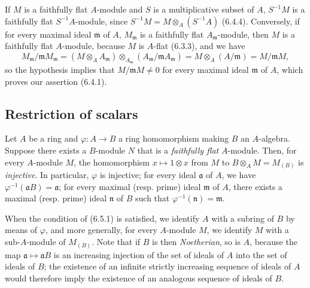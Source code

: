 \begin{env}[6.4.5]
\label{0.6.4.5}
If $M$ is a faithfully flat $A$-module and $S$ is a multiplicative
subset of $A$, $S^{-1}M$ is a faithfully flat $S^{-1}A$-module,
since $S^{-1}M=M\otimes_A(S^{-1}A)$ (6.4.4). Conversely, if for every
maximal ideal $\mathfrak{m}$ of $A$, $M_\mathfrak{m}$ is a faithfully flat
$A_\mathfrak{m}$-module, then $M$ is a faithfully flat $A$-module,
because $M$ is $A$-flat (6.3.3), and we have
\[
  M_\mathfrak{m}/\mathfrak{m}M_\mathfrak{m}
  =(M\otimes_A A_\mathfrak{m})
  \otimes_{A_\mathfrak{m}}
  (A_\mathfrak{m}/\mathfrak{m}A_\mathfrak{m})
  =M\otimes_A(A/\mathfrak{m})
  =M/\mathfrak{m}M,
\]
so the hypothesis implies that $M/\mathfrak{m}M\neq0$ for every maximal
ideal $\mathfrak{m}$ of $A$, which proves our assertion (6.4.1).
\end{env}

\subsection{Restriction of scalars}
\label{subsection:0.6.5}

\begin{env}[6.5.1]
\label{0.6.5.1}
Let $A$ be a ring and $\varphi:A\to B$ a ring homomorphism making
$B$ an $A$-algebra. Suppose there exists a $B$-module $N$ that is a
\emph{faithfully flat} $A$-module. Then, for every $A$-module $M$,
the homomorphism $x\mapsto 1\otimes x$ from $M$ to
$B\otimes_A M=M_{(B)}$ is \emph{injective}. In particular, $\varphi$ is
injective; for every ideal $\mathfrak{a}$ of $A$, we have
$\varphi^{-1}(\mathfrak{a}B)=\mathfrak{a}$; for every maximal (resp.
prime) ideal $\mathfrak{m}$ of $A$, there exists a maximal (resp. prime) ideal
$\mathfrak{n}$ of $B$ such that $\varphi^{-1}(\mathfrak{n})=\mathfrak{m}$.
\end{env}

\begin{env}[6.5.2]
\label{0.6.5.2}
When the condition of (6.5.1) is satisfied, we identify $A$ with a
subring of $B$ by means of $\varphi$, and more generally, for every $A$-module
$M$, we identify $M$ with a sub-$A$-module of $M_{(B)}$. Note that if
$B$ is then \emph{Noetherian}, so is $A$, because the map
$\mathfrak{a}\mapsto\mathfrak{a}B$ is an increasing injection of
the set of ideals of $A$ into the set of ideals of $B$;
the existence of an infinite strictly increasing sequence of ideals of $A$
would therefore imply the existence of an analogous sequence of ideals of $B$.
\end{env}


